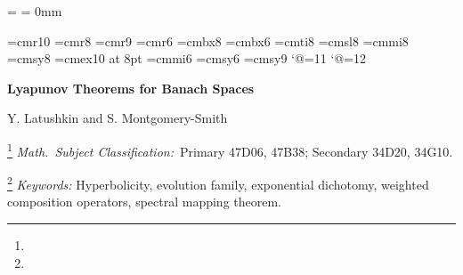 \magnification=
\baselineskip = 0mm

\def\Head#1:{\medskip \noindent {\bf #1:}\ \ }

\def\implies{$\Rightarrow$}


\def\Bbb{\bf}

\def\R{{\Bbb R}}
\def\D{{\Bbb D}}
\def\T{{\Bbb T}}
\def\Z{{\Bbb Z}}

\def\Re{\mathop{\rm Re}}
\def\Im{\mathop{\rm Im}}
\def\Ker{\mathop{\rm Ker}}
\def\normo#1{\left\|#1\right\|}

\def\moreproclaim{\par}


\font\tenrm=cmr10
\font\eightrm=cmr8
\font\ninerm=cmr9
\font\sixrm=cmr6
\font\eightbf=cmbx8
\font\sixbf=cmbx6
\font\eightit=cmti8
\font\eightsl=cmsl8
\font\eighti=cmmi8
\font\eightsy=cmsy8
\font\eightex=cmex10 at 8pt
\font\sixi=cmmi6
\font\sixsy=cmsy6
\font\ninesy=cmsy9
\catcode`@=11
\def\eightbig#1{{\hbox{$\textfont0=\ninerm\textfont2=\ninesy
\left#1\vbox to6.5pt{}\right.\n@space$}}}
\catcode`@=12
\def\eightpoint{\eightrm \normalbaselineskip=4 mm%
\textfont0=\eightrm \scriptfont0=\sixrm \scriptscriptfont0=\fiverm%
\def\rm{\fam0 \eightrm}%
\textfont1=\eighti \scriptfont1=\sixi \scriptscriptfont1=\fivei%
\def\mit{\fam1 } \def\oldstyle{\fam1 \eighti}%
\textfont2=\eightsy \scriptfont2=\sixsy \scriptscriptfont2=\fivesy%
\def\cal{\fam2 }%
\textfont3=\eightex \scriptfont3=\eightex \scriptscriptfont3=\eightex%
\def\bf{\fam\bffam\eightbf} \textfont\bffam\eightbf
\scriptfont\bffam=\sixbf \scriptscriptfont\bffam=\fivebf
\def\it{\fam\itfam\eightit} \textfont\itfam\eightit
\def\sl{\fam\slfam\eightsl} \textfont\slfam\eightsl
\let\big=\eightbig \normalbaselines\rm
}

\centerline{\bf Lyapunov Theorems for Banach Spaces}

\bigskip

\centerline {Y. Latushkin and S. Montgomery-Smith}


\footnote{}{ {\it Math.\ Subject
Classification:}\
Primary 47D06, 47B38;
Secondary 34D20, 34G10.}

\footnote {}{\noindent
{\it Keywords:} Hyperbolicity, evolution family,
exponential dichotomy,
weighted composition operators, spectral mapping theorem.}

